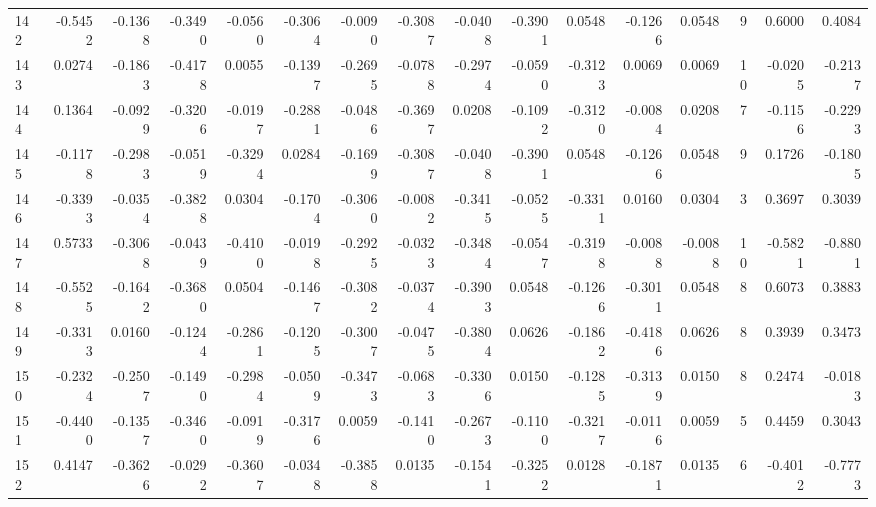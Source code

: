 \begin{tabular}{lrrrrrrrrrrrrrrr}
142 &     -0.5452 & -0.1368 & -0.3490 & -0.0560 & -0.3064 & -0.0090 & -0.3087 & -0.0408 & -0.3901 &  0.0548 &  -0.1266 &     0.0548 &      9 &                    0.6000 &                     0.4084 \\
143 &      0.0274 & -0.1863 & -0.4178 &  0.0055 & -0.1397 & -0.2695 & -0.0788 & -0.2974 & -0.0590 & -0.3123 &   0.0069 &     0.0069 &     10 &                   -0.0205 &                    -0.2137 \\
144 &      0.1364 & -0.0929 & -0.3206 & -0.0197 & -0.2881 & -0.0486 & -0.3697 &  0.0208 & -0.1092 & -0.3120 &  -0.0084 &     0.0208 &      7 &                   -0.1156 &                    -0.2293 \\
145 &     -0.1178 & -0.2983 & -0.0519 & -0.3294 &  0.0284 & -0.1699 & -0.3087 & -0.0408 & -0.3901 &  0.0548 &  -0.1266 &     0.0548 &      9 &                    0.1726 &                    -0.1805 \\
146 &     -0.3393 & -0.0354 & -0.3828 &  0.0304 & -0.1704 & -0.3060 & -0.0082 & -0.3415 & -0.0525 & -0.3311 &   0.0160 &     0.0304 &      3 &                    0.3697 &                     0.3039 \\
147 &      0.5733 & -0.3068 & -0.0439 & -0.4100 & -0.0198 & -0.2925 & -0.0323 & -0.3484 & -0.0547 & -0.3198 &  -0.0088 &    -0.0088 &     10 &                   -0.5821 &                    -0.8801 \\
148 &     -0.5525 & -0.1642 & -0.3680 &  0.0504 & -0.1467 & -0.3082 & -0.0374 & -0.3903 &  0.0548 & -0.1266 &  -0.3011 &     0.0548 &      8 &                    0.6073 &                     0.3883 \\
149 &     -0.3313 &  0.0160 & -0.1244 & -0.2861 & -0.1205 & -0.3007 & -0.0475 & -0.3804 &  0.0626 & -0.1862 &  -0.4186 &     0.0626 &      8 &                    0.3939 &                     0.3473 \\
150 &     -0.2324 & -0.2507 & -0.1490 & -0.2984 & -0.0509 & -0.3473 & -0.0683 & -0.3306 &  0.0150 & -0.1285 &  -0.3139 &     0.0150 &      8 &                    0.2474 &                    -0.0183 \\
151 &     -0.4400 & -0.1357 & -0.3460 & -0.0919 & -0.3176 &  0.0059 & -0.1410 & -0.2673 & -0.1100 & -0.3217 &  -0.0116 &     0.0059 &      5 &                    0.4459 &                     0.3043 \\
152 &      0.4147 & -0.3626 & -0.0292 & -0.3607 & -0.0348 & -0.3858 &  0.0135 & -0.1541 & -0.3252 &  0.0128 &  -0.1871 &     0.0135 &      6 &                   -0.4012 &                    -0.7773 \\

\end{tabular}
